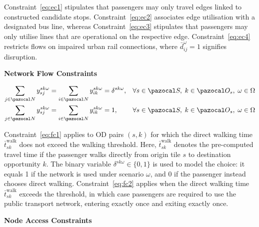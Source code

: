 \documentclass[3p,times,procedia]{elsarticle}
\begin{document}
Constraint~\eqref{eq:ec1} stipulates that passengers may only travel edges linked to constructed candidate stops.
Constraint~\eqref{eq:ec2} associates edge utilisation with a designated bus line, whereas Constraint~\eqref{eq:ec3} stipulates that passengers may only utilise lines that are operational on the respective edge. 
Constraint~\eqref{eq:ec4} restricts flows on impaired urban rail connections, where $\bar{d}_{ij}^\omega=1$ signifies disruption. 

\textbf{Network Flow Constraints}

\begin{align}
\sum_{j \in \pazocal N} y_{sj}^{sk\omega} &= \sum_{i \in \pazocal N} y_{ik}^{sk\omega} = \delta^{sk\omega},
&& \forall s \in \pazocal S,\; k \in \pazocal O_s,\; \omega \in \Omega
\label{eq:fc1} \\
\sum_{j \in \pazocal N} y_{sj}^{sk\omega} &= \sum_{i \in \pazocal N} y_{ik}^{sk\omega} = 1,
&& \forall s \in \pazocal S,\; k \in \pazocal O_s,\; \omega \in \Omega
\label{eq:fc2}
\end{align}

Constraint~\eqref{eq:fc1} applies to OD pairs \((s,k)\) for which the direct walking time \(\bar{t}_{sk}^{\text{walk}}\) does not exceed the walking threshold.  
Here, \(\bar{t}_{sk}^{\text{walk}}\) denotes the pre-computed travel time if the passenger walks directly from origin tile \(s\) to destination opportunity \(k\).  
The binary variable \(\delta^{sk\omega}\in\{0,1\}\) is used to model the choice: it equals 1 if the network is used under scenario \(\omega\), and 0 if the passenger instead chooses direct walking.  
%
Constraint~\eqref{eq:fc2} applies when the direct walking time \(\bar{t}_{sk}^{\text{walk}}\) exceeds the threshold, in which case passengers are required to use the public transport network, entering exactly once and exiting exactly once.

\textbf{Node Access Constraints}
\end{document}
